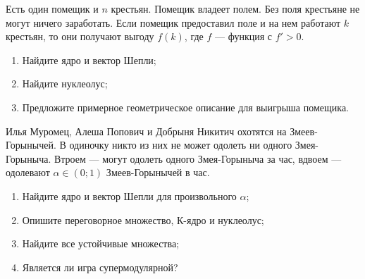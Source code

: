 \begin{problem}

Есть один помещик и $n$ крестьян. Помещик владеет полем. Без поля крестьяне не могут ничего заработать. Если помещик предоставил поле и на нем работают $k$ крестьян, то они получают выгоду $f(k)$, где $f$ — функция с $f'>0$.
\begin{enumerate}
\item Найдите ядро и вектор Шепли;
\item Найдите нуклеолус;
\item Предложите примерное геометрическое описание для выигрыша помещика.
\end{enumerate}



\begin{sol}

\end{sol}
\end{problem}




\begin{problem}


Илья Муромец, Алеша Попович и Добрыня Никитич охотятся на Змеев-Горынычей. В одиночку никто из них не может одолеть ни одного Змея-Горыныча. Втроем — могут одолеть одного Змея-Горыныча за час, вдвоем — одолевают $\alpha\in (0;1)$ Змеев-Горынычей в час.
\begin{enumerate}
\item Найдите ядро и вектор Шепли для произвольного $\alpha$;
\item Опишите переговорное множество, К-ядро и нуклеолус;
\item Найдите все устойчивые множества;

\item Является ли игра супермодулярной?
\end{enumerate}



\begin{sol}

\end{sol}
\end{problem}




